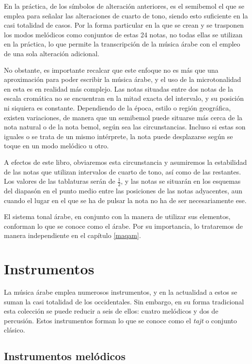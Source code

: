     En la práctica, de los símbolos de alteración anteriores, es el semibemol el que se emplea para señalar las alteraciones de cuarto de tono, siendo esto suficiente en la casi totalidad de casos. Por la forma particular en la que se crean y se trasponen los modos melódicos como conjuntos de estas 24 notas, no todas ellas se utilizan en la práctica, lo que permite la transcripción de la música árabe con el empleo de una sola alteración adicional.

    No obstante, es importante recalcar que este enfoque no es más que una aproximación para poder escribir la música árabe, y el uso de la microtonalidad en esta es en realidad más complejo. Las notas situadas entre dos notas de la escala cromática no se encuentran en la mitad exacta del intervalo, y su posición ni siquiera es constante. Dependiendo de la época, estilo o región geográfica, existen variaciones, de manera que un semibemol puede situarse más cerca de la nota natural o de la nota bemol, según sea las circunstancias. Incluso si estas son iguales o se trata de un mismo intérprete, la nota puede desplazarse según se toque en un modo melódico u otro.

    A efectos de este libro, obviaremos esta circunstancia y asumiremos la estabilidad de las notas que utilizan intervalos de cuarto de tono, así como de las restantes. Los valores de las tablaturas serán de $\frac12$, y las notas se situarán en los esquemas del diapasón en el punto medio entre las posiciones de las notas adyacentes, aun cuando el lugar en el que se ha de pulsar la nota no ha de ser necesariamente ese.

    El sistema tonal árabe, en conjunto con la manera de utilizar sus elementos, conforman lo que se conoce como el \maqam árabe. Por su importancia, lo trataremos de manera independiente en el capítulo \ref{maqam}.

\label{instrumentos}
\section{Instrumentos}

    La música árabe emplea numerosos instrumentos, y en la actualidad a estos se suman la casi totalidad de los occidentales. Sin embargo, en su forma tradicional esta colección se puede reducir a seis de ellos: cuatro melódicos y dos de percusión. Estos instrumentos forman lo que se conoce como el \emph{tajt} o conjunto clásico.

    \subsection{Instrumentos melódicos}


